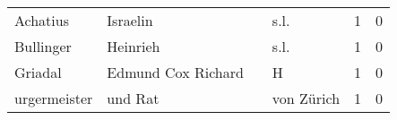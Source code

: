 \begin{center}
\begin{tiny}
\begin{longtabu}{llllrr}
                 Achatius &                           Israelin &             &                                        s.l. &          1 &         0 \\
                Bullinger &                           Heinrieh &             &                                        s.l. &          1 &         0 \\
                  Griadal &                 Edmund Cox Richard &             &                                           H &          1 &         0 \\
             urgermeister &                            und Rat &             &                                  von Zürich &          1 &         0 \\
\bottomrule
\end{longtabu}




\end{tiny}

\end{center}


